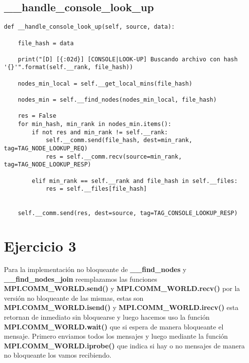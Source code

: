 \subsection{\_\_handle\_console\_look\_up}

\begin{lstlisting}
def __handle_console_look_up(self, source, data):

    file_hash = data

    print("[D] [{:02d}] [CONSOLE|LOOK-UP] Buscando archivo con hash '{}'".format(self.__rank, file_hash))

    nodes_min_local = self.__get_local_mins(file_hash)

    nodes_min = self.__find_nodes(nodes_min_local, file_hash)

    res = False
    for min_hash, min_rank in nodes_min.items():
        if not res and min_rank != self.__rank:
            self.__comm.send(file_hash, dest=min_rank, tag=TAG_NODE_LOOKUP_REQ)
            res = self.__comm.recv(source=min_rank, tag=TAG_NODE_LOOKUP_RESP)
        
        elif min_rank == self.__rank and file_hash in self.__files:
            res = self.__files[file_hash]


    self.__comm.send(res, dest=source, tag=TAG_CONSOLE_LOOKUP_RESP)
\end{lstlisting}

\section{Ejercicio 3}
Para la implementación no bloqueante de \textbf{\_\_find\_nodes} y  \textbf{\_\_find\_nodes\_join} reemplazamos las funciones \\ \textbf{MPI.COMM\_WORLD.send()} y \textbf{MPI.COMM\_WORLD.recv()} por la versión no bloqueante de las mismas, estas son \textbf{MPI.COMM\_WORLD.isend()} y \textbf{MPI.COMM\_WORLD.irecv()} esta retornan de inmediato sin bloquearse y luego hacemos uso la función \textbf{MPI.COMM\_WORLD.wait()} que si espera de manera bloqueante el mensaje. Primero enviamos todos los mensajes y luego mediante la función \textbf{MPI.COMM\_WORLD.iprobe()} que indica si hay o no mensajes de manera no bloqueante los vamos recibiendo.

